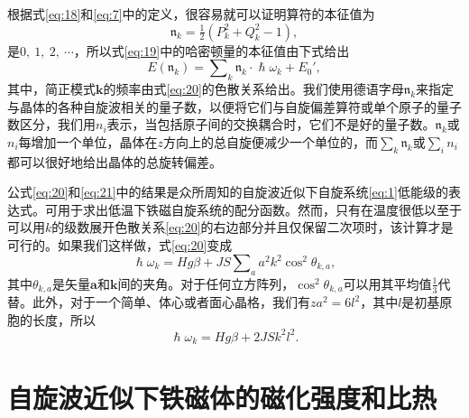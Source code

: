 \documentclass{article}
\begin{document}
根据式\eqref{eq:18}和\eqref{eq:7}中的定义，很容易就可以证明算符的本征值为
\begin{equation*}
\mathfrak{n}_k=\tfrac{1}{2}(P_k^2+Q_k^2-1),
\end{equation*}
是$0,~1,~2,~\cdots$，所以式\eqref{eq:19}中的哈密顿量的本征值由下式给出
\begin{equation} \label{eq:21}
E(\mathfrak{n}_k)=\sum\nolimits_k\mathfrak{n}_k\cdot\hslash\omega_k+E_0',
\end{equation}
其中，简正模式$\mathbf{k}$的频率由式\eqref{eq:20}的色散关系给出。我们使用德语字母$\mathfrak{n}_k$来指定与晶体的各种自旋波相关的量子数，以便将它们与自旋偏差算符或单个原子的量子数区分，我们用$n_i$表示，当包括原子间的交换耦合时，它们不是好的量子数。$\mathfrak{n}_k$或$n_i$每增加一个单位，晶体在$z$方向上的总自旋便减少一个单位的，而$\sum_k\mathfrak{n}_k$或$\sum_i n_i$都可以很好地给出晶体的总旋转偏差。


公式\eqref{eq:20}和\eqref{eq:21}中的结果是众所周知的自旋波近似下自旋系统\eqref{eq:1}低能级的表达式。可用于求出低温下铁磁自旋系统的配分函数。然而，只有在温度很低以至于可以用$k$的级数展开色散关系\eqref{eq:20}的右边部分并且仅保留二次项时，该计算才是可行的。如果我们这样做，式\eqref{eq:20}变成
\begin{equation} \label{eq:22}
\hslash\omega_k=Hg\beta+JS\sum\nolimits_aa^2k^2\cos^2\theta_{k,a},
\end{equation}
其中$\theta_{k,a}$是矢量$\mathbf{a}$和$\mathbf{k}$间的夹角。对于任何立方阵列，$\cos^2\theta_{k,a}$可以用其平均值$\frac{1}{3}$代替。此外，对于一个简单、体心或者面心晶格，我们有$za^2=6l^2$，其中$l$是初基原胞的长度，所以
\begin{equation} \label{eq:23}
\hslash\omega_k=Hg\beta+2JSk^2l^2.
\end{equation}




\section{自旋波近似下铁磁体的磁化强度和比热} \label{sec:4}
\end{document}
